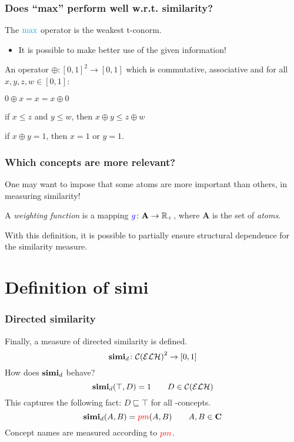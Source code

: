 \documentclass{beamer}
\begin{document}
\begin{frame}
  \frametitle{Does ``max'' perform well w.r.t. similarity?}
  The \(\textcolor{cyan}{\max}\) operator is the weakest \alert{t-conorm}.
  \begin{itemize}
    \item It is possible to make better use of
          the given information!
  \end{itemize}
  \pause
  \begin{definition}
    An operator \(\oplus \colon {[0,1]}^2 \to [0,1]\) which is
    commutative, associative and for all
    \(x, y, z, w \in [0,1]\):
    \begin{description}[<+->]
      \item[Unit element] \(0 \oplus x = x = x \oplus 0\)
      \item[Monotonicity] if \(x \le z\) and \(y \le w\), then \(x \oplus y \le z \oplus w\)
      \item[Boundedness] if \(x \oplus y = 1\), then \(x = 1\) or \(y = 1\).
    \end{description}
  \end{definition}
\end{frame}

\begin{frame}
  \frametitle{Which concepts are more relevant?}
  One may want to impose that some atoms are
  more important than others, in measuring similarity!
  \begin{definition}
    A \emph{weighting function} is a mapping 
    \(\textcolor{blue}{g} \colon \mathbf{A} \to \mathbb{R}_+\),
     where \(\mathbf{A}\) is the set of \emph{atoms}.
  \end{definition}
  With this definition, it is possible to partially
  ensure structural dependence for the similarity
  measure.
\end{frame}

\section{Definition of simi}

\begin{frame}
  \frametitle{Directed similarity}
  Finally, a measure of \alert{directed similarity} is defined.
  \begin{equation}
    \simi_d \colon {\mathcal{C}(\mathcal{ELH})}^2%
    \to [0,1]
  \end{equation}
  How does \(\operatorname{\mathbf{simi}}_d\) behave?
  \begin{equation}
    \operatorname{\mathbf{simi}}_d(\top,D) = 1 \qquad D \in \mathcal{C}(\mathcal{ELH})
  \end{equation}
  This captures the following fact: \(D \sqsubseteq \top\)
  for all \elh-concepts.
  \begin{equation}
    \operatorname{\mathbf{simi}}_d(A,B) = \textcolor{red}{pm}(A,B) \qquad A,B \in \mathbf{C}
  \end{equation}
  Concept names are measured according to \(\textcolor{red}{pm}\).
\end{frame}
\end{document}
